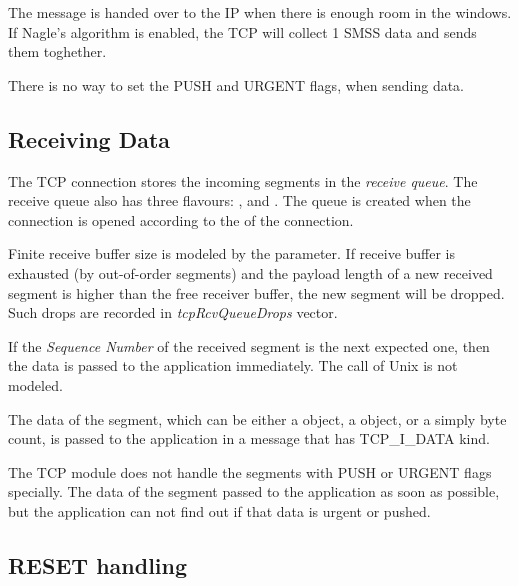 The message is handed over to the IP when there is
enough room in the windows. If Nagle's algorithm is
enabled, the TCP will collect 1 SMSS data and sends
them toghether.

\begin{note}
There is no way to set the PUSH and URGENT flags, when sending data.
\end{note}


\subsection{Receiving Data}

The TCP connection stores the incoming segments in the
\emph{receive queue}. The receive queue also has three flavours:
, 
and . The queue is created
when the connection is opened according to the 
of the connection.

Finite receive buffer size is modeled by the 
parameter. If receive buffer is exhausted (by out-of-order
segments) and the payload length of a new received segment
is higher than the free receiver buffer, the new segment will be dropped.
Such drops are recorded in \emph{tcpRcvQueueDrops} vector.

If the \emph{Sequence Number} of the received segment is the next
expected one, then the data is passed
to the application immediately. The  call of
Unix is not modeled.

The data of the segment, which can be either a 
object, a  object, or a simply byte count,
is passed to the application in a message that has
TCP\_I\_DATA kind.


\begin{note}
The TCP module does not handle the segments with PUSH or URGENT
flags specially. The data of the segment passed to the application
as soon as possible, but the application can not find out if that
data is urgent or pushed.
\end{note}

\subsection{RESET handling}

